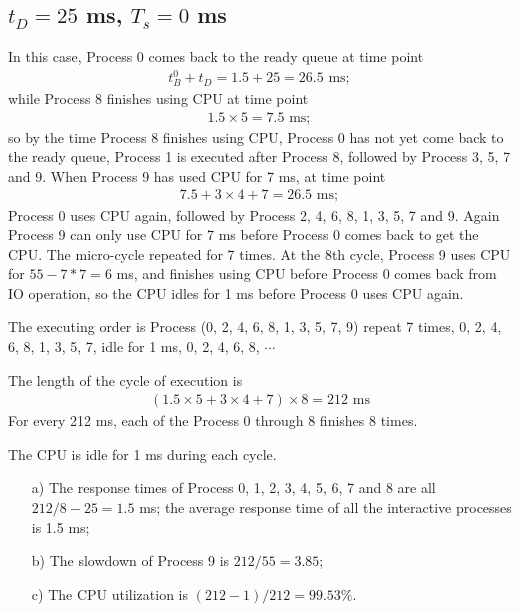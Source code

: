 \documentclass[12pt,letterpaper]{article}
\begin{document}
\subsection{$t_D=25$ ms, $T_s = 0$ ms}
In this case, Process 0 comes back to the ready queue at time point
\begin{eqnarray}
t_B^0+t_D=1.5+25=26.5\textrm{ ms};
\end{eqnarray}
while Process 8 finishes using CPU at time point 
\begin{eqnarray}
1.5\times5=7.5\textrm{ ms};
\end{eqnarray}
so by the time Process 8 finishes using CPU, Process 0 has not yet come back to the ready queue, Process 1 is executed after Process 8, followed by Process 3, 5, 7 and 9. When Process 9 has used CPU for 7 ms, at time point
\begin{eqnarray}
7.5+3\times4+7=26.5\textrm{ ms};
\end{eqnarray}
Process 0 uses CPU again, followed by Process 2, 4, 6, 8, 1, 3, 5, 7 and 9. Again Process 9 can only use CPU for 7 ms before Process 0 comes back to get the CPU. The micro-cycle repeated for 7 times. At the 8th cycle, Process 9 uses CPU for $55-7*7=6$ ms, and finishes using CPU before Process 0 comes back from IO operation, so the CPU idles for 1 ms before Process 0 uses CPU again.

The executing order is Process (0, 2, 4, 6, 8, 1, 3, 5, 7, 9) repeat 7 times, 0, 2, 4, 6, 8, 1, 3, 5, 7, idle for 1 ms, 0, 2, 4, 6, 8, $\cdots$

The length of the cycle of execution is 
\begin{eqnarray}
(1.5\times5+3\times4+7)\times8=212\textrm{ ms}
\end{eqnarray}
For every 212 ms, each of the Process 0 through 8 finishes 8 times.

The CPU is idle for 1 ms during each cycle.

\begin{enumerate}
\item[a)] The response times of Process 0, 1, 2, 3, 4, 5, 6, 7 and 8 are all $212/8-25=1.5$ ms; the average response time of all the interactive processes is 1.5 ms;
\item[b)] The slowdown of Process 9 is $212/55=3.85$;
\item[c)] The CPU utilization is $(212-1)/212=99.53\%$.
\end{enumerate}
\end{document}

